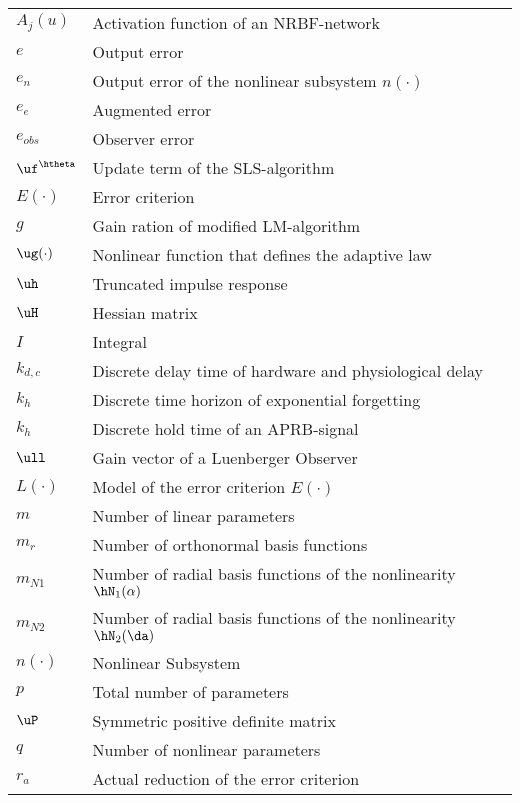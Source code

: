 \begin{longtable}[l]{ll}
$A_j(u)$											& Activation function of an NRBF-network\\
$e$														& Output error \\
$e_n$													& Output error of the nonlinear subsystem $n(\cdot)$\\
$e_e$													& Augmented error\\
$e_{obs}$											& Observer error\\ 
$\uf^{\htheta}$					  		& Update term of the SLS-algorithm\\
$E(\cdot)$										& Error criterion\\
$g$														& Gain ration of modified LM-algorithm\\
$\ug(\cdot)$									& Nonlinear function that defines the adaptive law\\
$\uh$	  											& Truncated impulse response\\
$\uH$													& Hessian matrix\\
$I$						  							& Integral\\
$k_{d,c}$											& Discrete delay time of hardware and physiological delay\\
$k_h$													& Discrete time horizon of exponential forgetting\\
$k_h$													& Discrete hold time of an APRB-signal\\
$\ull$           							& Gain vector of a Luenberger Observer\\
$L(\cdot)$ 										& Model of the error criterion $E(\cdot)$\\
$m$ 													& Number of linear parameters\\
$m_r$													& Number of orthonormal basis functions\\
$m_{N1}$								  		& Number of radial basis functions of the nonlinearity $\hN_1(\alpha)$\\
$m_{N2}$											& Number of radial basis functions of the nonlinearity $\hN_2(\da)$\\
$n(\cdot)$  									& Nonlinear Subsystem\\	
$p$ 													& Total number of parameters\\
$\uP$													& Symmetric positive definite matrix\\
$q$ 													& Number of nonlinear parameters\\
$r_a$													& Actual reduction of the error criterion\\

\end{longtable}
